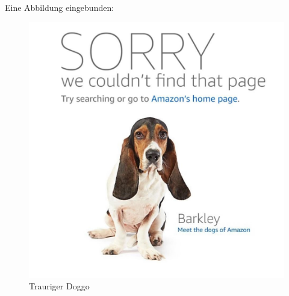 Eine Abbildung eingebunden: 
\begin{figure}[h]
    \centering
    \includegraphics[width=\textwidth,height=\textheight,keepaspectratio]{assets/images/TraurigerDoggo.jpg}
    \caption{Trauriger Doggo}
    \label{fig:my_label}
\end{figure}